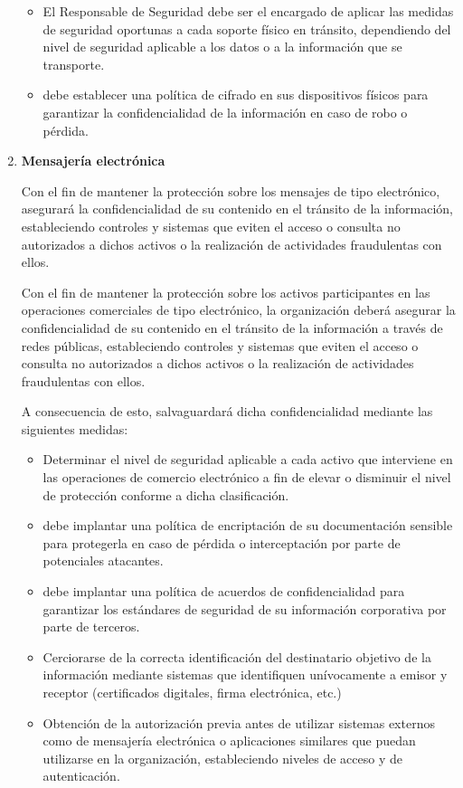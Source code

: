 \begin{enumerate}[label=\alph*)]
\begin{itemize}
    \item El Responsable de Seguridad debe ser el encargado de aplicar las medidas de seguridad oportunas a cada soporte físico en tránsito, dependiendo del nivel de seguridad aplicable a los datos o a la información que se transporte.
    \item \Beneficiario{} debe establecer una política de cifrado en sus dispositivos físicos para garantizar la confidencialidad de la información en caso de robo o pérdida.
\end{itemize}

\item \textbf{Mensajería electrónica}

Con el fin de mantener la protección sobre los mensajes de tipo electrónico, \Beneficiario{} asegurará la confidencialidad de su contenido en el tránsito de la información, estableciendo controles y sistemas que eviten el acceso o consulta no autorizados a dichos activos o la realización de actividades fraudulentas con ellos.

Con el fin de mantener la protección sobre los activos participantes en las operaciones comerciales de tipo electrónico, la organización deberá asegurar la confidencialidad de su contenido en el tránsito de la información a través de redes públicas, estableciendo controles y sistemas que eviten el acceso o consulta no autorizados a dichos activos o la realización de actividades fraudulentas con ellos.

A consecuencia de esto, \Beneficiario{} salvaguardará dicha confidencialidad mediante las siguientes medidas:

\begin{itemize}
    \item Determinar el nivel de seguridad aplicable a cada activo que interviene en las operaciones de comercio electrónico a fin de elevar o disminuir el nivel de protección conforme a dicha clasificación.
    \item \Beneficiario{} debe implantar una política de encriptación de su documentación sensible para protegerla en caso de pérdida o interceptación por parte de potenciales atacantes.
    \item \Beneficiario{} debe implantar una política de acuerdos de confidencialidad para garantizar los estándares de seguridad de su información corporativa por parte de terceros.
    \item Cerciorarse de la correcta identificación del destinatario objetivo de la información mediante sistemas que identifiquen unívocamente a emisor y receptor (certificados digitales, firma electrónica, etc.)
    \item Obtención de la autorización previa antes de utilizar sistemas externos como de mensajería electrónica o aplicaciones similares que puedan utilizarse en la organización, estableciendo niveles de acceso y de autenticación.
\end{itemize}


\end{enumerate}
